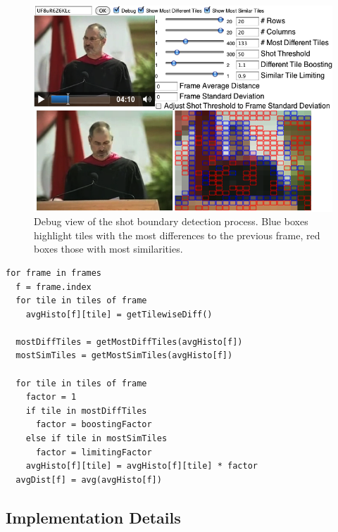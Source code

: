 \begin{figure}
  \begin{center}
    \includegraphics[width=1.0\linewidth]{./algorithm.png}
  \end{center}
  \caption{Debug view of the shot boundary detection process.
    Blue boxes highlight tiles with the most differences
    to the previous frame, red boxes those with most similarities.}
  \label{fig:algorithm}
\end{figure}

\begin{lstlisting}[caption=Pseudocode of shot boundary detection
  algorithm.,
  label=code:algorithm, float]
for frame in frames
  f = frame.index  
  for tile in tiles of frame      
    avgHisto[f][tile] = getTilewiseDiff()
 
  mostDiffTiles = getMostDiffTiles(avgHisto[f])
  mostSimTiles = getMostSimTiles(avgHisto[f])
 
  for tile in tiles of frame    
    factor = 1  
    if tile in mostDiffTiles
      factor = boostingFactor
    else if tile in mostSimTiles
      factor = limitingFactor
    avgHisto[f][tile] = avgHisto[f][tile] * factor
  avgDist[f] = avg(avgHisto[f])
\end{lstlisting}

\subsection{Implementation Details}
\label{sec:implementation}

